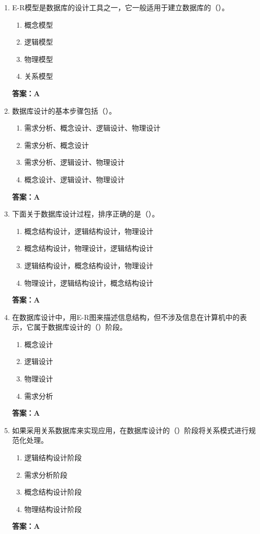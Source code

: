 \documentclass[12pt, a4paper]{article}
\begin{document}
\begin{enumerate}[label=\arabic*.]
	\item E-R模型是数据库的设计工具之一，它一般适用于建立数据库的（\quad）。
	      \begin{enumerate}
		      \item 概念模型
		      \item 逻辑模型
		      \item 物理模型
		      \item 关系模型
	      \end{enumerate}
	      \textbf{答案：A}

	\item 数据库设计的基本步骤包括（\quad）。
	      \begin{enumerate}
		      \item 需求分析、概念设计、逻辑设计、物理设计
		      \item 需求分析、概念设计
		      \item 需求分析、逻辑设计、物理设计
		      \item 概念设计、逻辑设计、物理设计
	      \end{enumerate}
	      \textbf{答案：A}

	\item 下面关于数据库设计过程，排序正确的是（\quad）。
	      \begin{enumerate}
		      \item 概念结构设计，逻辑结构设计，物理设计
		      \item 概念结构设计，物理设计，逻辑结构设计
		      \item 逻辑结构设计，概念结构设计，物理设计
		      \item 物理设计，逻辑结构设计，概念结构设计
	      \end{enumerate}
	      \textbf{答案：A}

	\item 在数据库设计中，用E-R图来描述信息结构，但不涉及信息在计算机中的表示，它属于数据库设计的（\quad）阶段。
	      \begin{enumerate}
		      \item 概念设计
		      \item 逻辑设计
		      \item 物理设计
		      \item 需求分析
	      \end{enumerate}
	      \textbf{答案：A}

	\item 如果采用关系数据库来实现应用，在数据库设计的（\quad）阶段将关系模式进行规范化处理。
	      \begin{enumerate}
		      \item 逻辑结构设计阶段
		      \item 需求分析阶段
		      \item 概念结构设计阶段
		      \item 物理结构设计阶段
	      \end{enumerate}
	      \textbf{答案：A}


\end{enumerate}
\end{document}
